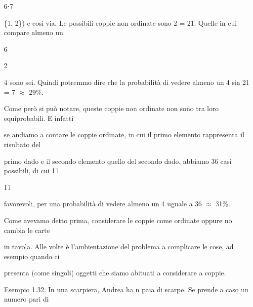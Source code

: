 \documentclass[a4paper,portrait,12pt]{article}
\begin{document}
6⋅7


\begin{flushleft}
\{1, 2\}) e così via. Le possibili coppie non ordinate sono 2 = 21. Quelle in cui compare almeno un
\end{flushleft}


6


2


\begin{flushleft}
4 sono sei. Quindi potremmo dire che la probabilit\`{a} di vedere almeno un 4 sia 21 = 7 $\approx$ 29\%.
\end{flushleft}


\begin{flushleft}
Come per\`{o} si pu\`{o} notare, queste coppie non ordinate non sono tra loro equiprobabili. E infatti
\end{flushleft}


\begin{flushleft}
se andiamo a contare le coppie ordinate, in cui il primo elemento rappresenta il risultato del
\end{flushleft}


\begin{flushleft}
primo dado e il secondo elemento quello del secondo dado, abbiamo 36 casi possibili, di cui 11
\end{flushleft}


11


\begin{flushleft}
favorevoli, per una probabilit\`{a} di vedere almeno un 4 uguale a 36 $\approx$ 31\%.
\end{flushleft}


\begin{flushleft}
Come avevamo detto prima, considerare le coppie come ordinate oppure no cambia le carte
\end{flushleft}


\begin{flushleft}
in tavola. Alle volte \`{e} l'ambientazione del problema a complicare le cose, ad esempio quando ci
\end{flushleft}


\begin{flushleft}
presenta (come singoli) oggetti che siamo abituati a considerare a coppie.
\end{flushleft}


\begin{flushleft}
Esempio 1.32. In una scarpiera, Andrea ha n paia di scarpe. Se prende a caso un numero pari di
\end{flushleft}
\end{document}

